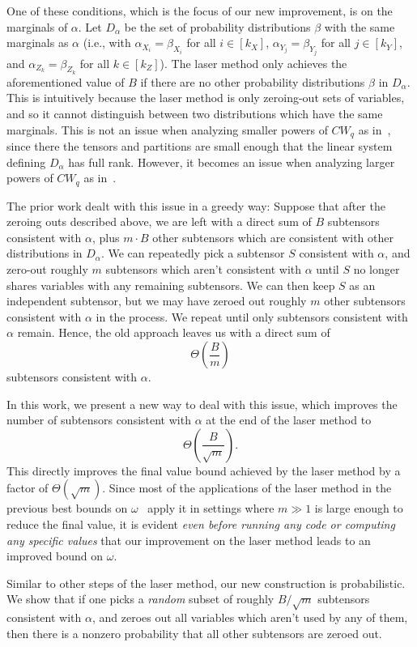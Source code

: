 \documentclass{theoretics}
\begin{document}
One of these conditions, which is the focus of our new improvement, is on the marginals of $\alpha$. Let $D_\alpha$ be the set of probability distributions $\beta$ with the same marginals as $\alpha$ (i.e., with $\alpha_{X_i} = \beta_{X_i}$ for all $i \in [k_X]$, $\alpha_{Y_j} = \beta_{Y_j}$ for all $j \in [k_Y]$, and $\alpha_{Z_k} = \beta_{Z_k}$ for all $k \in [k_Z]$). The laser method only achieves the aforementioned value of $B$ if there are no other probability distributions $\beta$ in $D_\alpha$. This is intuitively because the laser method is only zeroing-out sets of variables, and so it cannot distinguish between two distributions which have the same marginals. This is not an issue when analyzing smaller powers of $CW_q$ as in~\cite{coppersmith,stothers}, since there the tensors and partitions are small enough that the linear system defining $D_\alpha$ has full rank. However, it becomes an issue when analyzing larger powers of $CW_q$ as in~\cite{v12,legall}.

The prior work dealt with this issue in a greedy way: Suppose that after the zeroing outs described above, we are left with a direct sum of $B$ subtensors consistent with $\alpha$, plus $m \cdot B$ other subtensors which are consistent with other distributions in $D_\alpha$. We can repeatedly pick a subtensor $S$ consistent with $\alpha$, and zero-out roughly $m$ subtensors which aren't consistent with $\alpha$ until $S$ no longer shares variables with any remaining subtensors. We can then keep $S$ as an independent subtensor, but we may have zeroed out roughly $m$ other subtensors consistent with $\alpha$ in the process. We repeat until only subtensors consistent with $\alpha$ remain. Hence, the old approach leaves us with a direct sum of $$\Theta\left(\frac{B}{m}\right)$$ subtensors consistent with $\alpha$.

In this work, we present a new way to deal with this issue, which improves the number of subtensors consistent with $\alpha$ at the end of the laser method to $$\Theta\left( \frac{B}{\sqrt{m}}\right).$$ 
This directly improves the final value bound achieved by the laser method by a factor of $\Theta(\sqrt{m})$. Since most of the applications of the laser method in the previous best bounds on $\omega$~\cite{v12,legall} apply it in settings where $m \gg 1$ is large enough to reduce the final value, it is evident \emph{even before running any code or computing any specific values} that our improvement on the laser method leads to an improved bound on $\omega$.

Similar to other steps of the laser method, our new construction is probabilistic. We show that if one picks a \emph{random} subset of roughly $B / \sqrt{m}$ subtensors consistent with $\alpha$, and zeroes out all variables which aren't used by any of them, then there is a nonzero probability that all other subtensors are zeroed out.
\end{document}
